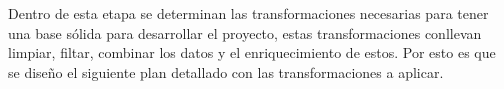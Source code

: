 Dentro de esta etapa se determinan las transformaciones necesarias para tener una base sólida para desarrollar el proyecto, estas transformaciones conllevan limpiar, filtar, combinar los datos y el enriquecimiento de estos. Por esto es que se diseño el siguiente plan detallado con las transformaciones a aplicar.
